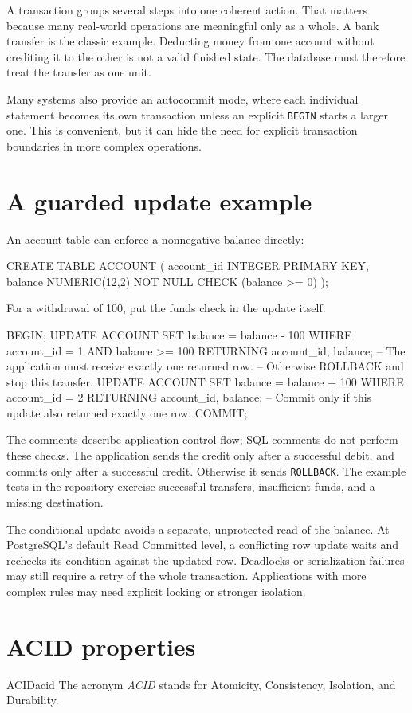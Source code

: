 \documentclass[11pt,a4paper,openany]{book}
\begin{document}
A transaction groups several steps into one coherent action. That matters because many real-world operations are meaningful only as a whole. A bank transfer is the classic example. Deducting money from one account without crediting it to the other is not a valid finished state. The database must therefore treat the transfer as one unit.

Many systems also provide an autocommit mode, where each individual statement becomes its own transaction unless an explicit \texttt{BEGIN} starts a larger one. This is convenient, but it can hide the need for explicit transaction boundaries in more complex operations.

\section{A guarded update example}
An account table can enforce a nonnegative balance directly:
\begin{codesql}
CREATE TABLE ACCOUNT (
  account_id INTEGER PRIMARY KEY,
  balance NUMERIC(12,2) NOT NULL CHECK (balance >= 0)
);
\end{codesql}
For a withdrawal of 100, put the funds check in the update itself:
\begin{codesql}
BEGIN;
UPDATE ACCOUNT
SET balance = balance - 100
WHERE account_id = 1 AND balance >= 100
RETURNING account_id, balance;
-- The application must receive exactly one returned row.
-- Otherwise ROLLBACK and stop this transfer.
UPDATE ACCOUNT
SET balance = balance + 100
WHERE account_id = 2
RETURNING account_id, balance;
-- Commit only if this update also returned exactly one row.
COMMIT;
\end{codesql}
The comments describe application control flow; SQL comments do not perform these checks. The application sends the credit only after a successful debit, and commits only after a successful credit. Otherwise it sends \texttt{ROLLBACK}. The example tests in the repository exercise successful transfers, insufficient funds, and a missing destination.

The conditional update avoids a separate, unprotected read of the balance. At PostgreSQL's default Read Committed level, a conflicting row update waits and rechecks its condition against the updated row. Deadlocks or serialization failures may still require a retry of the whole transaction. Applications with more complex rules may need explicit locking or stronger isolation.

\section{ACID properties}
\begin{definition}{ACID}{acid}
The acronym \emph{ACID} stands for Atomicity, Consistency, Isolation, and Durability.
\end{definition}
\end{document}
